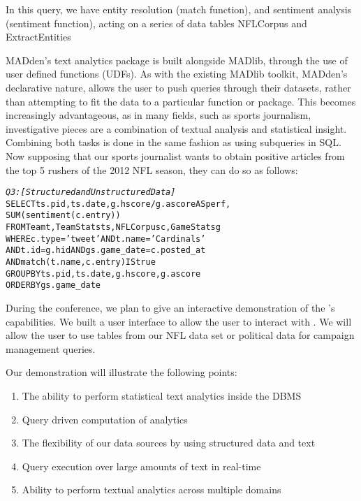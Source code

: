 In this query, we have entity resolution (match function), and sentiment
analysis (sentiment function), acting on a series of data tables NFLCorpus and
ExtractEntities 

MADden's text analytics package is built alongside MADlib, through the use of
user defined functions (UDFs). As with the existing MADlib toolkit, MADden's 
declarative nature, allows the user to push queries through their datasets,
rather than attempting to fit the data to a particular function or package.
This becomes increasingly advantageous, as in many fields, such as sports
journalism, investigative pieces are a combination of textual analysis and
statistical insight. Combining both tasks is done in the same fashion as
using subqueries in SQL. Now supposing that our sports journalist wants
to obtain positive articles from the top 5 rushers of the 2012 NFL season,
they can do so as follows:


\begin{small}
\begin{alltt}
\textit{Q3: [Structured and Unstructured Data]}
SELECT ts.pid, ts.date, g.hscore / g.ascore AS perf,
  SUM(sentiment(c.entry))
FROM Team t, TeamStats ts, NFLCorpus c, GameStats g
WHERE c.type = 'tweet' AND t.name = 'Cardinals' 
  AND t.id = g.hid AND gs.game_date = c.posted_at 
  AND match(t.name,c.entry) IS true
GROUP BY ts.pid, ts.date, g.hscore, g.ascore
ORDER BY gs.game_date
\end{alltt}
\end{small}


During the conference, we plan to give an interactive demonstration of the 
{\system}'s capabilities.
We built a user interface to allow the user to interact with \system. 
We will allow the user to use tables from our NFL data set or political data
for campaign management queries.

Our demonstration will illustrate the following points: 
\begin{enumerate}
  \item The ability to perform statistical text analytics inside the DBMS
  \item Query driven computation of analytics
  \item The flexibility of our data sources by using structured data and text
  \item Query execution over large amounts of text in real-time
  \item Ability to perform textual analytics across multiple domains
\end{enumerate} 

